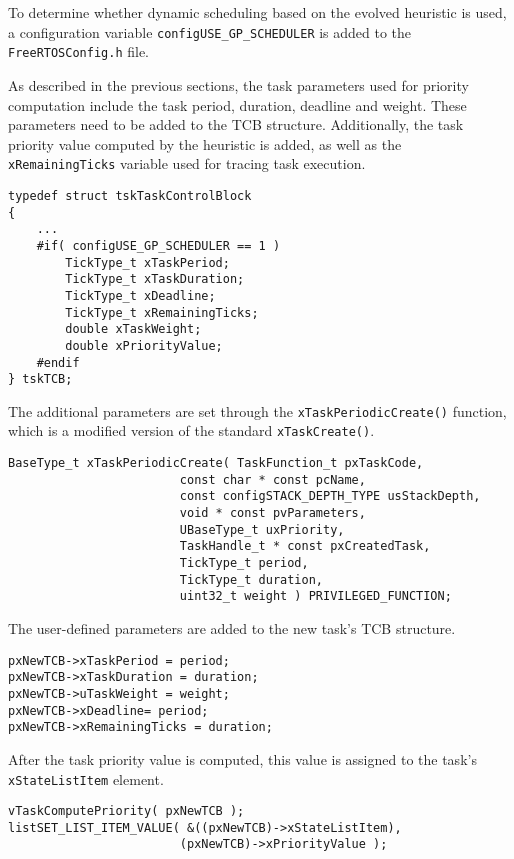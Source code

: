To determine whether dynamic scheduling based on the evolved heuristic is used, a configuration variable \verb$configUSE_GP_SCHEDULER$ is added to the \verb$FreeRTOSConfig.h$ file. 

As described in the previous sections, the task parameters used for priority computation include the task period, duration, deadline and weight. 
These parameters need to be added to the TCB structure. 
Additionally, the task priority value computed by the heuristic is added, as well as the \verb$xRemainingTicks$ variable used for tracing task execution.
\begin{lstlisting}[frame=none, label={TCB}, caption={Modification of the TCB.}, captionpos=b]
typedef struct tskTaskControlBlock
{
	...
	#if( configUSE_GP_SCHEDULER == 1 )
		TickType_t xTaskPeriod;
		TickType_t xTaskDuration;
		TickType_t xDeadline;
		TickType_t xRemainingTicks;
		double xTaskWeight;
		double xPriorityValue;
	#endif
} tskTCB;
\end{lstlisting}
The additional parameters are set through the \verb$xTaskPeriodicCreate()$ function, which is a modified version of the standard \verb$xTaskCreate()$.
\begin{lstlisting}[frame=none, label={periodicCreate}, caption={The \texttt{xTaskPeriodicCreate()} function prototype.}, captionpos=b]
BaseType_t xTaskPeriodicCreate(	TaskFunction_t pxTaskCode,
						const char * const pcName,		
						const configSTACK_DEPTH_TYPE usStackDepth,
						void * const pvParameters,
						UBaseType_t uxPriority,
						TaskHandle_t * const pxCreatedTask,
						TickType_t period,
						TickType_t duration,
						uint32_t weight ) PRIVILEGED_FUNCTION;
\end{lstlisting}
The user-defined parameters are added to the new task's TCB structure. 
\begin{lstlisting}[frame=none, label={TCB_params}, caption={Adding the user-defined task parameters to the TCB structure.}, captionpos=b]
pxNewTCB->xTaskPeriod = period;
pxNewTCB->xTaskDuration = duration;
pxNewTCB->uTaskWeight = weight;
pxNewTCB->xDeadline= period;
pxNewTCB->xRemainingTicks = duration;
\end{lstlisting}
After the task priority value is computed, this value is assigned to the task's \\\verb$xStateListItem$ element. 
\begin{lstlisting}[frame=none, label={init_priority}, caption={Assigning the task priority to the \texttt{xStateListItem} element.}, captionpos=b]
vTaskComputePriority( pxNewTCB );
listSET_LIST_ITEM_VALUE( &((pxNewTCB)->xStateListItem), 
						(pxNewTCB)->xPriorityValue );
\end{lstlisting}
